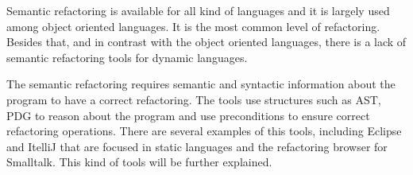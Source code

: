 Semantic refactoring is available for all kind of languages and it is largely used among object oriented languages.
It is the most common level of refactoring.
Besides that, and in contrast with the object oriented languages, there is a lack of semantic refactoring tools for dynamic languages.

The semantic refactoring requires semantic and syntactic information about the program to have a correct refactoring.
The tools use structures such as AST, PDG to reason about the program and use preconditions to ensure correct refactoring operations.
There are several examples of this tools, including Eclipse and ItelliJ that are focused in static languages and the refactoring browser for Smalltalk.
This kind of tools will be further explained. 

